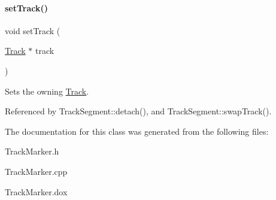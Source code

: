 \paragraph{\texorpdfstring{set\+Track()}{setTrack()}}
{\footnotesize\ttfamily void set\+Track (\begin{DoxyParamCaption}\item[{\hyperlink{classKite_1_1Track}{Track} $\ast$}]{track }\end{DoxyParamCaption})\hspace{0.3cm}{\ttfamily [inline]}}

Sets the owning \hyperlink{classKite_1_1Track}{Track}. 

Referenced by Track\+Segment\+::detach(), and Track\+Segment\+::swap\+Track().



The documentation for this class was generated from the following files\+:\begin{DoxyCompactItemize}
\item 
Track\+Marker.\+h\item 
Track\+Marker.\+cpp\item 
Track\+Marker.\+dox\end{DoxyCompactItemize}
